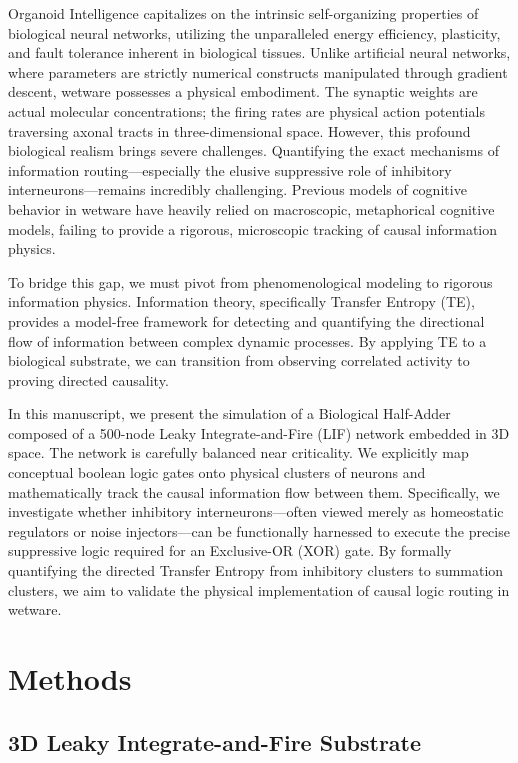 \documentclass[12pt, a4paper]{article}
\begin{document}
Organoid Intelligence capitalizes on the intrinsic self-organizing properties of biological neural networks, utilizing the unparalleled energy efficiency, plasticity, and fault tolerance inherent in biological tissues. Unlike artificial neural networks, where parameters are strictly numerical constructs manipulated through gradient descent, wetware possesses a physical embodiment. The synaptic weights are actual molecular concentrations; the firing rates are physical action potentials traversing axonal tracts in three-dimensional space. However, this profound biological realism brings severe challenges. Quantifying the exact mechanisms of information routing—especially the elusive suppressive role of inhibitory interneurons—remains incredibly challenging. Previous models of cognitive behavior in wetware have heavily relied on macroscopic, metaphorical cognitive models, failing to provide a rigorous, microscopic tracking of causal information physics.

To bridge this gap, we must pivot from phenomenological modeling to rigorous information physics. Information theory, specifically Transfer Entropy (TE), provides a model-free framework for detecting and quantifying the directional flow of information between complex dynamic processes. By applying TE to a biological substrate, we can transition from observing correlated activity to proving directed causality. 

In this manuscript, we present the simulation of a Biological Half-Adder composed of a 500-node Leaky Integrate-and-Fire (LIF) network embedded in 3D space. The network is carefully balanced near criticality. We explicitly map conceptual boolean logic gates onto physical clusters of neurons and mathematically track the causal information flow between them. Specifically, we investigate whether inhibitory interneurons—often viewed merely as homeostatic regulators or noise injectors—can be functionally harnessed to execute the precise suppressive logic required for an Exclusive-OR (XOR) gate. By formally quantifying the directed Transfer Entropy from inhibitory clusters to summation clusters, we aim to validate the physical implementation of causal logic routing in wetware.

\section{Methods}

\subsection{3D Leaky Integrate-and-Fire Substrate}
\end{document}
